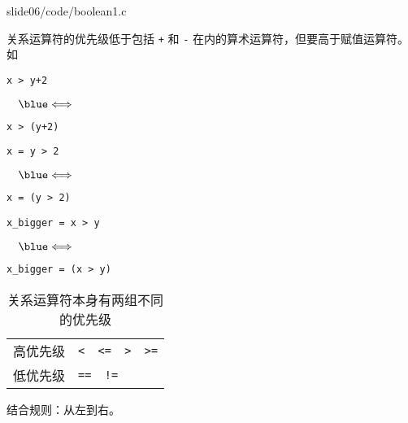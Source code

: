 \begin{frame}[fragile]
  
  {slide06/code/boolean1.c}
\end{frame}


\begin{frame}[fragile]
关系运算符的优先级低于包括 \lstinline|+| 和 \lstinline|-| 在内的算术运算符，但要高于赋值运算符。如

\begin{minipage}{.4\textwidth}
\begin{lstlisting}
x > y+2
\end{lstlisting}
\end{minipage}$~~~\blue\Longleftrightarrow~~~$
\begin{minipage}{.4\textwidth}
\begin{lstlisting}
x > (y+2)
\end{lstlisting}
\end{minipage}

\begin{minipage}{.4\textwidth}
\begin{lstlisting}
x = y > 2
\end{lstlisting}
\end{minipage}$~~~\blue\Longleftrightarrow~~~$
\begin{minipage}{.4\textwidth}
\begin{lstlisting}
x = (y > 2)
\end{lstlisting}
\end{minipage}


\begin{minipage}{.4\textwidth}
\begin{lstlisting}
x_bigger = x > y
\end{lstlisting}
\end{minipage}$~~~\blue\Longleftrightarrow~~~$
\begin{minipage}{.4\textwidth}
\begin{lstlisting}
x_bigger = (x > y)
\end{lstlisting}
\end{minipage}
\end{frame}

\begin{frame}[fragile]
\begin{table}
\centering
\caption{关系运算符本身有两组不同的优先级}
\begin{tabular}{p{2cm}|p{4cm}}\hline
高优先级 & \lstinline|<  <=  >  >=|\\[0.1in]
低优先级 & \lstinline|==  !=|\\\hline
\end{tabular}
\end{table}

\begin{center}
结合规则：从左到右。
\end{center}
\end{frame}


